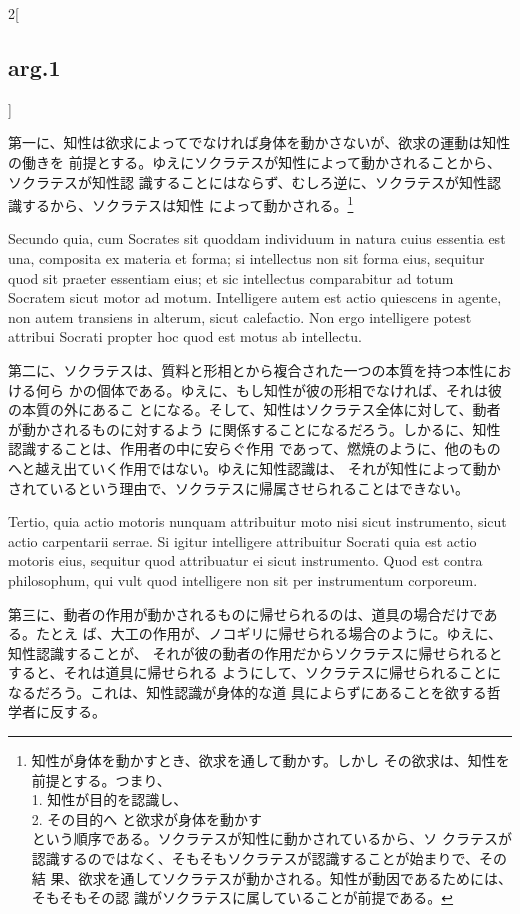 \documentclass[paper=a4paper,fontsize=10pt,jafontsize=9pt,titlepage]{jlreq}
\begin{document}
\begin{paracol}{2}[\subsection{arg.1}]
\switchcolumn

第一に、知性は欲求によってでなければ身体を動かさないが、欲求の運動は知性の働きを
前提とする。ゆえにソクラテスが知性によって動かされることから、ソクラテスが知性認
識することにはならず、むしろ逆に、ソクラテスが知性認識するから、ソクラテスは知性
によって動かされる。\footnote{知性が身体を動かすとき、欲求を通して動かす。しかし
その欲求は、知性を前提とする。つまり、\\ 1. 知性が目的を認識し、\\ 2. その目的へ
と欲求が身体を動かす\\という順序である。ソクラテスが知性に動かされているから、ソ
クラテスが認識するのではなく、そもそもソクラテスが認識することが始まりで、その結
果、欲求を通してソクラテスが動かされる。知性が動因であるためには、そもそもその認
識がソクラテスに属していることが前提である。}
 
\switchcolumn*

Secundo quia, cum Socrates sit quoddam individuum in natura cuius essentia est
una, composita ex materia et forma; si intellectus non sit forma eius, sequitur
quod sit praeter essentiam eius; et sic intellectus comparabitur ad totum
Socratem sicut motor ad motum. Intelligere autem est actio quiescens in agente,
non autem transiens in alterum, sicut calefactio. Non ergo intelligere potest
attribui Socrati propter hoc quod est motus ab intellectu.
 
\switchcolumn

第二に、ソクラテスは、質料と形相とから複合された一つの本質を持つ本性における何ら
かの個体である。ゆえに、もし知性が彼の形相でなければ、それは彼の本質の外にあるこ
とになる。そして、知性はソクラテス全体に対して、動者が動かされるものに対するよう
に関係することになるだろう。しかるに、知性認識することは、作用者の中に安らぐ作用
であって、燃焼のように、他のものへと越え出ていく作用ではない。ゆえに知性認識は、
それが知性によって動かされているという理由で、ソクラテスに帰属させられることはできない。
 
\switchcolumn*


 Tertio, quia actio motoris nunquam attribuitur moto nisi sicut instrumento,
 sicut actio carpentarii serrae. Si igitur intelligere attribuitur Socrati quia
 est actio motoris eius, sequitur quod attribuatur ei sicut instrumento. Quod
 est contra philosophum, qui vult quod intelligere non sit per instrumentum
 corporeum.
 
\switchcolumn

第三に、動者の作用が動かされるものに帰せられるのは、道具の場合だけである。たとえ
ば、大工の作用が、ノコギリに帰せられる場合のように。ゆえに、知性認識することが、
それが彼の動者の作用だからソクラテスに帰せられるとすると、それは道具に帰せられる
ようにして、ソクラテスに帰せられることになるだろう。これは、知性認識が身体的な道
具によらずにあることを欲する哲学者に反する。
 

\end{paracol}
\end{document}
